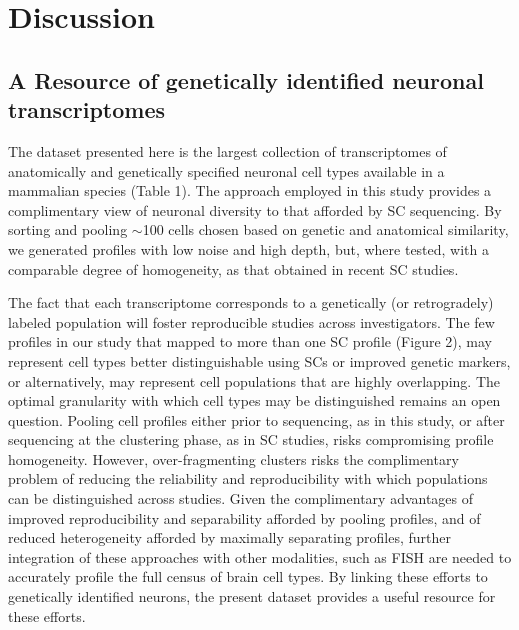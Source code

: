 
\section{Discussion}

\subsection{A Resource of genetically identified neuronal transcriptomes}

The dataset presented here is the largest collection of transcriptomes of anatomically and genetically specified neuronal cell types available in a mammalian species (Table 1). The approach employed in this study provides a complimentary view of neuronal diversity to that afforded by SC sequencing. By sorting and pooling $\sim$100 cells chosen based on genetic and anatomical similarity, we generated profiles with low noise and high depth, but, where tested, with a comparable degree of homogeneity, as that obtained in recent SC studies. 

The fact that each transcriptome corresponds to a genetically (or retrogradely) labeled population will foster reproducible studies across investigators. The few profiles in our study that mapped to more than one SC profile (Figure 2), may represent cell types better distinguishable using SCs or improved genetic markers, or alternatively, may represent cell populations that are highly overlapping. The optimal granularity with which cell types may be distinguished remains an open question. Pooling cell profiles either prior to sequencing, as in this study, or after sequencing at the clustering phase, as in SC studies, risks compromising profile homogeneity. However, over-fragmenting clusters risks the complimentary problem of reducing the reliability and reproducibility with which populations can be distinguished across studies. Given the complimentary advantages of improved reproducibility and separability afforded by pooling profiles, and of reduced heterogeneity afforded by maximally separating profiles, further integration of these approaches with other modalities, such as FISH \citep{Moffitt_2016} are needed to accurately profile the full census of brain cell types. By linking these efforts to genetically identified neurons, the present dataset provides a useful resource for these efforts. 

